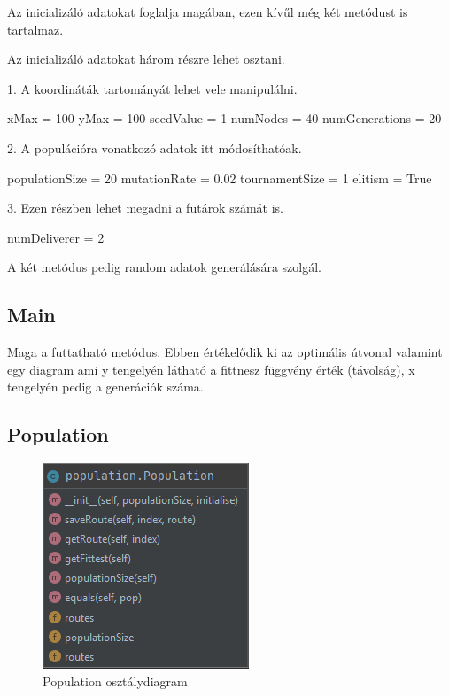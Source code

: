Az inicializáló adatokat foglalja magában, ezen kívűl még két metódust is tartalmaz.

Az inicializáló adatokat három részre lehet osztani.

1. A koordináták tartományát lehet vele manipulálni.

\begin{python}
xMax = 100
yMax = 100
seedValue = 1
numNodes = 40
numGenerations = 20
\end{python}

2. A populációra vonatkozó adatok itt módosíthatóak.

\begin{python}
populationSize = 20
mutationRate = 0.02
tournamentSize = 1
elitism = True
\end{python}

3. Ezen részben lehet megadni a futárok számát is.

\begin{python}
numDeliverer = 2
\end{python}

A két metódus pedig random adatok generálására szolgál.

\subsection{
Main
}

Maga a futtatható metódus. Ebben értékelődik ki az optimális útvonal valamint egy diagram ami y tengelyén látható a fittnesz függvény érték (távolság), x tengelyén pedig a generációk száma.

\subsection{
Population
}

\begin{figure}[!htb]
\centering
\includegraphics[scale=0.8]{images/population.png}
\caption{Population osztálydiagram}
\label{fig:population}
\end{figure}


